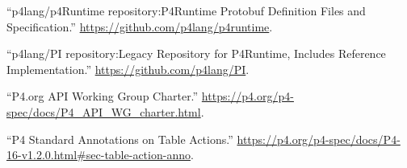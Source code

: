\documentclass[11pt]{article}
\begin{document}
{{\begin{thebibliography}{38}
\mdbibitemlabel{{}[14]}\textquotedblleft{}p4lang/p4Runtime repository:P4Runtime Protobuf Definition Files and Specification.\textquotedblright{} \href{https://github.com/p4lang/p4runtime}{{\ttfamily https://\hspace{0pt}github.\hspace{0pt}com/\hspace{0pt}p4lang/\hspace{0pt}p4runtime}}.\label{p4runtimerepo}%

\mdbibitemlabel{{}[15]}\textquotedblleft{}p4lang/PI repository:Legacy Repository for P4Runtime, Includes Reference Implementation.\textquotedblright{} \href{https://github.com/p4lang/PI}{{\ttfamily https://\hspace{0pt}github.\hspace{0pt}com/\hspace{0pt}p4lang/\hspace{0pt}PI}}.\label{pirepo}%

\mdbibitemlabel{{}[16]}\textquotedblleft{}P4.org API Working Group Charter.\textquotedblright{} \href{https://p4.org/p4-spec/docs/P4_API_WG_charter.html}{{\ttfamily https://\hspace{0pt}p4.\hspace{0pt}org/\hspace{0pt}p4-\hspace{0pt}spec/\hspace{0pt}docs/\hspace{0pt}P4\_\hspace{0pt}API\_\hspace{0pt}WG\_\hspace{0pt}charter.\hspace{0pt}html}}.\label{p4apiwgcharter}%

\mdbibitemlabel{{}[17]}\textquotedblleft{}P4 Standard Annotations on Table Actions.\textquotedblright{} \href{https://p4.org/p4-spec/docs/P4-16-v1.2.0.html\%23sec-table-action-anno}{{\ttfamily https://\hspace{0pt}p4.\hspace{0pt}org/\hspace{0pt}p4-\hspace{0pt}spec/\hspace{0pt}docs/\hspace{0pt}P4-\hspace{0pt}16-\hspace{0pt}v1.\hspace{0pt}2.\hspace{0pt}0.\hspace{0pt}html\#\hspace{0pt}sec-\hspace{0pt}table-\hspace{0pt}action-\hspace{0pt}anno}}.\label{p4actionannotations}%


\end{thebibliography}}}
\end{document}
